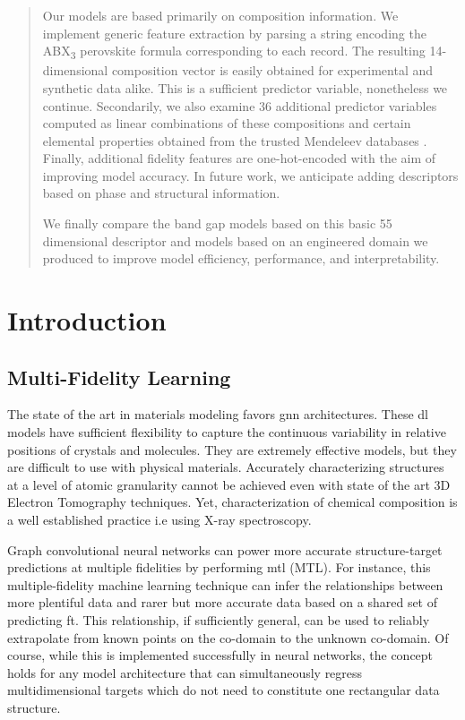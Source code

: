 \documentclass[aip, jmp, amsmath, amssymb, nofootinbib]{revtex4-2}
\begin{document}
\begin{abstract}
Our models are based primarily on composition information. We implement generic feature extraction by parsing a string
encoding the ABX\textsubscript{3} perovskite formula corresponding to each record. The resulting 14-dimensional composition vector is
easily obtained for experimental and synthetic data alike. This is a sufficient predictor variable, nonetheless we
continue. Secondarily, we also examine 36 additional predictor variables computed as linear combinations of these
compositions and certain elemental properties obtained from the trusted Mendeleev databases \cite{mentel-2014}. Finally,
additional fidelity features are one-hot-encoded with the aim of improving model accuracy. In future work, we anticipate
adding descriptors based on phase and structural information.

We finally compare the band gap models based on this basic 55 dimensional descriptor and models based on an engineered
domain we produced to improve model efficiency, performance, and interpretability.
\end{abstract}
\section*{Introduction}
\label{sec:org3482c4a}
\subsection*{Multi-Fidelity Learning}
\label{sec:orge0a9039}
The state of the art in materials modeling favors \Acrfull{gnn}\cite{chen-2019-graph-networ,choudhary-2021-atomis-line,xie-2018-cryst-graph}
architectures. These \gls{dl} models have sufficient flexibility
to capture the continuous variability in relative positions of
crystals and molecules. They are extremely effective models, but they
are difficult to use with physical materials. Accurately
characterizing structures at a level of atomic granularity cannot be
achieved even with state of the art 3D Electron Tomography
techniques\cite{ercius-2015-elect-tomog}. Yet, characterization of
chemical composition is a well established practice i.e using X-ray
spectroscopy.

Graph convolutional neural networks can power more accurate
structure-target predictions at multiple
fidelities\cite{chen-2020-multi-fidel} by performing \Gls{mtl} (MTL). For instance, this multiple-fidelity machine learning
technique can infer the relationships between more plentiful  
data and rarer but more accurate  data based on a shared set of
predicting \gls{ft}. This relationship, if sufficiently general, can
be used to reliably extrapolate from known points on the  co-domain
to the unknown  co-domain. Of course, while this is implemented
successfully in neural networks, the concept holds for any model
architecture that can simultaneously regress multidimensional targets
which do not need to constitute one rectangular data structure.
\end{document}
